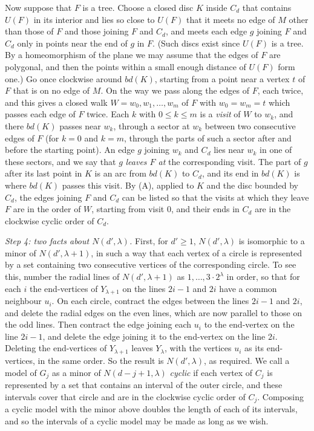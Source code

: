 {Now suppose that $F$ is a tree. Choose a closed disc $K$ inside $C_d$ that contains $U(F)$ in its interior and lies so close to $U(F)$ that it meets no edge of $M$ other than those of $F$ and those joining $F$ and $C_d$, and meets each edge $g$ joining $F$ and $C_d$ only in points near the end of $g$ in $F$. (Such discs exist since $U(F)$ is a tree. By a homeomorphism of the plane we may assume that the edges of $F$ are polygonal, and then the points within a small enough distance of $U(F)$ form one.) Go once clockwise around $bd(K)$, starting from a point near a vertex $t$ of $F$ that is on no edge of $M$. On the way we pass along the edges of $F$, each twice, and this gives a closed walk $W = w_0, w_1, \dots, w_m$ of $F$ with $w_0 = w_m = t$ which passes each edge of $F$ twice. Each $k$ with $0 \le k \le m$ is a \textit{visit} of $W$ to $w_k$, and there $bd(K)$ passes near $w_k$, through a sector at $w_k$ between two consecutive edges of $F$ (for $k = 0$ and $k = m$, through the parts of such a sector after and before the starting point). An edge $g$ joining $w_k$ and $C_d$ lies near $w_k$ in one of these sectors, and we say that $g$ \textit{leaves $F$ at} the corresponding visit. The part of $g$ after its last point in $K$ is an arc from $bd(K)$ to $C_d$, and its end in $bd(K)$ is where $bd(K)$ passes this visit. By (A), applied to $K$ and the disc bounded by $C_d$, the edges joining $F$ and $C_d$ can be listed so that the visits at which they leave $F$ are in the order of $W$, starting from visit $0$, and their ends in $C_d$ are in the clockwise cyclic order of $C_d$.

\textit{Step 4: two facts about $N(d', \lambda)$.} First, for $d' \ge 1$, $N(d', \lambda)$ is isomorphic to a minor of $N(d', \lambda + 1)$, in such a way that each vertex of a circle is represented by a set containing two consecutive vertices of the corresponding circle. To see this, number the radial lines of $N(d', \lambda + 1)$ as $1, \dots, 3 \cdot 2^\lambda$ in order, so that for each $i$ the end-vertices of $Y_{\lambda + 1}$ on the lines $2i - 1$ and $2i$ have a common neighbour $u_i$. On each circle, contract the edges between the lines $2i - 1$ and $2i$, and delete the radial edges on the even lines, which are now parallel to those on the odd lines. Then contract the edge joining each $u_i$ to the end-vertex on the line $2i - 1$, and delete the edge joining it to the end-vertex on the line $2i$. Deleting the end-vertices of $Y_{\lambda + 1}$ leaves $Y_\lambda$, with the vertices $u_i$ as its end-vertices, in the same order. So the result is $N(d', \lambda)$, as required. We call a model of $G_j$ as a minor of $N(d - j + 1, \lambda)$ \textit{cyclic} if each vertex of $C_j$ is represented by a set that contains an interval of the outer circle, and these intervals cover that circle and are in the clockwise cyclic order of $C_j$. Composing a cyclic model with the minor above doubles the length of each of its intervals, and so the intervals of a cyclic model may be made as long as we wish.

}
